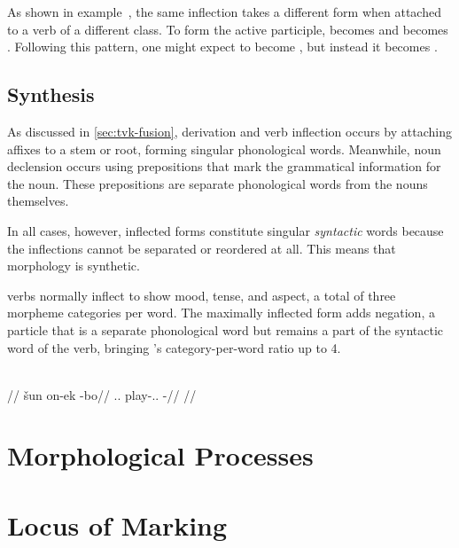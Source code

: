 As shown in example~, the same inflection takes a different form when attached to a verb of a different class. To form the active participle,  becomes  and  becomes . Following this pattern, one might expect  to become \ungr{}, but instead it becomes .


\subsection{Synthesis}
\label{sec:tvk-synthesis}

As discussed in \autoref{sec:tvk-fusion}, derivation and verb inflection occurs by attaching affixes to a stem or root, forming singular phonological words. Meanwhile, noun declension occurs using prepositions that mark the grammatical information for the noun. These prepositions are separate phonological words from the nouns themselves.

In all cases, however, inflected forms constitute singular \emph{syntactic} words because the inflections cannot be separated or reordered at all. This means that \langtvk{} morphology is synthetic\autocite{wals-22}.

\langtvk{} verbs normally inflect to show mood, tense, and aspect, a total of three morpheme categories per word. The maximally inflected form adds negation, a particle that is a separate phonological word but remains a part of the syntactic word of the verb, bringing \langtvk's category-per-word ratio up to 4\autocite{wals-22}.

	\begingl
		\glpreamble{}\\
		//
		\gla šun on-ek -bo//
		\glb \Tps.\An.\Top{} play-\Ind.\Pst.\Pfv{} -\Neg//
		\glft {}//
	\endgl
\xe



\section{Morphological Processes}
\label{sec:tvk-processes}


\section{Locus of Marking}
\label{sec:tvk-locus}

